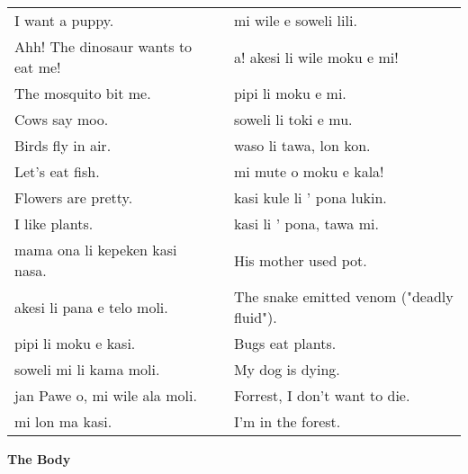 \begin{supertabular}{p{5,5cm}|ll}
I want a puppy.  && mi wile e soweli lili. \\ %
Ahh! The dinosaur wants to eat me!  && a! akesi li wile moku e mi! \\ %
The mosquito bit me.  && pipi li moku e mi.  \\ %
Cows say moo.  && soweli li toki e mu. \\ %
Birds fly in air.  && waso li tawa, lon kon. \\ %
Let's eat fish.  && mi mute o moku e kala! \\ %
Flowers are pretty.  && kasi kule li ' pona lukin. \\ %
I like plants.  && kasi li ' pona, tawa mi. \\
mama ona li kepeken kasi nasa.  && His mother used pot. \\
akesi li pana e telo moli.  && The snake emitted venom ("deadly fluid"). \\
pipi li moku e kasi.  && Bugs eat plants. \\
soweli mi li kama moli.  && My dog is dying. \\
jan Pawe o, mi wile ala moli.  && Forrest, I don't want to die. \\
mi lon ma kasi.  && I'm in the forest. \\
\end{supertabular} 

\textbf{The Body} 
\label{'the_body'}

